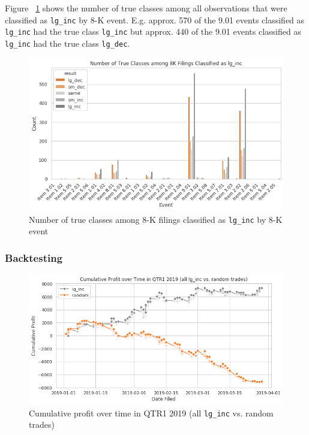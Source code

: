 \documentclass{article}
\begin{document}
 	Figure ~\ref{fig:class_by_lg_dec} shows the number of true classes among all observations that were classified as \lstinline{lg_inc} by 8-K event. E.g. approx. 570 of the 9.01 events classified as \lstinline{lg_inc} had the true class \lstinline{lg_inc} but approx. 440 of the 9.01 events classified as \lstinline{lg_inc} had the true class \lstinline{lg_dec}.

	\begin{figure}[h!]
		\includegraphics[width=\linewidth]{img/class_by_lg_dec.png}
		\caption{Number of true classes among 8-K filings classified as \lstinline{lg_inc} by 8-K event}
		\label{fig:class_by_lg_dec}
	\end{figure}

	\subsubsection{Backtesting}




	\begin{figure}[h!]
		\includegraphics[width=\linewidth]{img/trade_lg_inc_all.png}
		\caption{Cumulative profit over time in QTR1 2019 (all \lstinline{lg_inc} vs. random trades)}
		\label{fig:trade_lg_inc_all}
	\end{figure}
\end{document}
